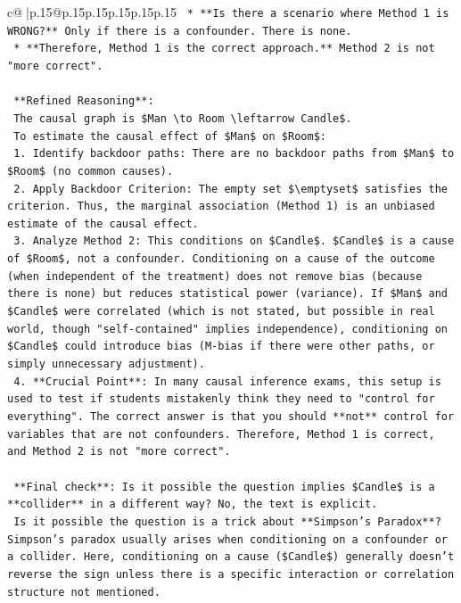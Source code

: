\documentclass{article}
\begin{document}
{\begin{supertabular}{c@{$\;$}|p{.15\linewidth}@{}p{.15\linewidth}p{.15\linewidth}p{.15\linewidth}p{.15\linewidth}p{.15\linewidth}}
{{{\texttt{    *   **Is there a scenario where Method 1 is WRONG?** Only if there is a confounder. There is none.} \\
\texttt{    *   **Therefore, Method 1 is the correct approach.** Method 2 is not "more correct".} \\
\\ 
\texttt{    **Refined Reasoning**:} \\
\texttt{    The causal graph is \$Man \textbackslash{}to Room \textbackslash{}leftarrow Candle\$.} \\
\texttt{    To estimate the causal effect of \$Man\$ on \$Room\$:} \\
\texttt{    1.  Identify backdoor paths: There are no backdoor paths from \$Man\$ to \$Room\$ (no common causes).} \\
\texttt{    2.  Apply Backdoor Criterion: The empty set \$\textbackslash{}emptyset\$ satisfies the criterion. Thus, the marginal association (Method 1) is an unbiased estimate of the causal effect.} \\
\texttt{    3.  Analyze Method 2: This conditions on \$Candle\$. \$Candle\$ is a cause of \$Room\$, not a confounder. Conditioning on a cause of the outcome (when independent of the treatment) does not remove bias (because there is none) but reduces statistical power (variance). If \$Man\$ and \$Candle\$ were correlated (which is not stated, but possible in real world, though "self{-}contained" implies independence), conditioning on \$Candle\$ could introduce bias (M{-}bias if there were other paths, or simply unnecessary adjustment).} \\
\texttt{    4.  **Crucial Point**: In many causal inference exams, this setup is used to test if students mistakenly think they need to "control for everything". The correct answer is that you should **not** control for variables that are not confounders. Therefore, Method 1 is correct, and Method 2 is not "more correct".} \\
\\ 
\texttt{    **Final check**: Is it possible the question implies \$Candle\$ is a **collider** in a different way? No, the text is explicit.} \\
\texttt{    Is it possible the question is a trick about **Simpson's Paradox**? Simpson's paradox usually arises when conditioning on a confounder or a collider. Here, conditioning on a cause (\$Candle\$) generally doesn't reverse the sign unless there is a specific interaction or correlation structure not mentioned.} \\
}}}
\end{supertabular}}
\end{document}
